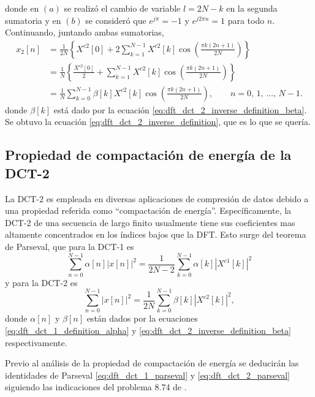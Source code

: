 \documentclass[a4paper]{report}
\begin{document}
donde en \((a)\) se realizó el cambio de variable \(l=2N-k\) en la segunda sumatoria y en \((b)\) se consideró que \(e^{j\pi}=-1\) y \(e^{j2\pi n}=1\) para todo \(n\). Continuando, juntando ambas sumatorias, 
\begin{align*}
 x_2[n]&=\frac{1}{2N}\left\{X^{c2}[0]+2\sum_{k=1}^{N-1}X^{c2}[k]\cos\left(\frac{\pi k(2n+1)}{2N}\right)\right\}\\
   &=\frac{1}{N}\left\{\frac{X^{c2}[0]}{2}+\sum_{k=1}^{N-1}X^{c2}[k]\cos\left(\frac{\pi k(2n+1)}{2N}\right)\right\}\\
   &=\frac{1}{N}\sum_{k=0}^{N-1}\beta[k]X^{c2}[k]\cos\left(\frac{\pi k(2n+1)}{2N}\right),
   \qquad 
   n=0,\,1,\,\dots,\,N-1.
\end{align*}
donde \(\beta[k]\) está dado por la ecuación \ref{eq:dft_dct_2_inverse_definition_beta}. Se obtuvo la ecuación \ref{eq:dft_dct_2_inverse_definition}, que es lo que se quería.

\subsection{Propiedad de compactación de energía de la DCT-2}

La DCT-2 es empleada en diversas aplicaciones de compresión de datos debido a una propiedad referida como ``compactación de energía''. Específicamente, la DCT-2 de una secuencia de largo finito usualmente tiene sus coeficientes mas altamente concentrados en los índices bajos que la DFT. Esto surge del teorema de Parseval, que para la DCT-1 es 
\begin{equation}\label{eq:dft_dct_1_parseval}
 \sum_{n=0}^{N-1}\alpha[n]|x[n]|^2=\frac{1}{2N-2}\sum_{k=0}^{N-1}\alpha[k]|X^{c1}[k]|^2
\end{equation}
y para la DCT-2 es
\begin{equation}\label{eq:dft_dct_2_parseval}
 \sum_{n=0}^{N-1}|x[n]|^2=\frac{1}{2N}\sum_{k=0}^{N-1}\beta[k]|X^{c2}[k]|^2,
\end{equation}
donde \(\alpha[n]\) y \(\beta[n]\) están dados por la ecuaciones \ref{eq:dft_dct_1_definition_alpha} y \ref{eq:dft_dct_2_inverse_definition_beta} respectivamente.

Previo al análisis de la propiedad de compactación de energía se deducirán las identidades de Parseval \ref{eq:dft_dct_1_parseval} y \ref{eq:dft_dct_2_parseval} siguiendo las indicaciones del problema 8.74 de \cite{oppenheim2009discrete}. 
\end{document}
